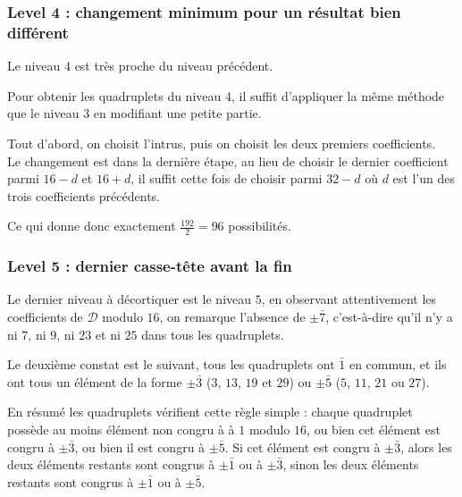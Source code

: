 \documentclass[12pt, a4paper]{memoir}
\begin{document}
  \subsubsection{Level 4 : changement minimum pour un résultat bien différent}
  
  Le niveau $4$ est très proche du niveau précédent.
  
  Pour obtenir les quadruplets du niveau $4$, il suffit d'appliquer la même méthode que le niveau $3$ en 
  modifiant une petite partie.
  
  Tout d'abord, on choisit l'intrus, puis on choisit les deux premiers coefficients. \\
  Le changement est dans la dernière étape, au lieu de choisir le dernier coefficient parmi $16-d$ et 
  $16+d$, il suffit cette fois de choisir parmi $32-d$ où $d$ est l'un des trois coefficients précédents.
  
  Ce qui donne donc exactement $\frac{192}{2} = 96$ possibilités.
  
  \subsubsection{Level 5 : dernier casse-tête avant la fin}
  
  Le dernier niveau à décortiquer est le niveau $5$, en observant attentivement les coefficients de $\mathcal{D}$ modulo $16$,
  on remarque l'absence de $\pm \bar{7}$, c'est-à-dire qu'il n'y a ni $7$, ni $9$, ni $23$ et ni $25$ dans tous les quadruplets.
  
  Le deuxième constat est le suivant, tous les quadruplets ont $\bar{1}$ en commun, et ils
  ont tous un élément de la forme $\pm \bar{3}$ ($3$, $13$, $19$ et $29$) ou $\pm \bar{5}$ ($5$, $11$, $21$ ou $27$).
  
  En résumé les quadruplets vérifient cette règle simple : chaque quadruplet possède au moins élément non congru à
  à $1$ modulo $16$, ou bien cet élément est congru à $\pm \bar{3}$, ou bien il est congru à $\pm \bar{5}$.
  Si cet élément est congru à $\pm \bar{3}$, alors les deux éléments restants sont congrus à $\pm \bar{1}$
  ou à $\pm \bar{3}$, sinon les deux éléments restants sont congrus à $\pm \bar{1}$ ou à $\pm \bar{5}$.
 
\end{document}
